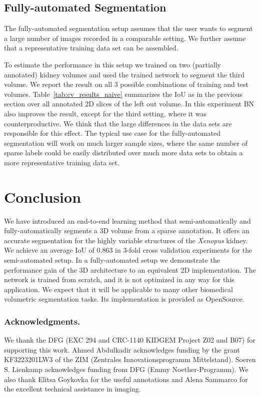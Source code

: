 \documentclass[runningheads,a4paper]{llncs}
\newcommand{\species}[1]{\textit{#1}}
\begin{document}
\subsection{Fully-automated Segmentation}

The fully-automated segmentation setup assumes that the user wants to segment a large number of images recorded in a comparable setting. We further assume that a representative training data set can be assembled. 

To estimate the performance in this setup we trained on two (partially annotated) kidney volumes and used the trained network to segment the third volume. We report the result on all 3 possible combinations of training and test volumes. Table~\ref{tab:cv_results_naive} summarizes the IoU as in the previous section over all annotated 2D slices of the left out volume. In this experiment BN also improves the result, except for the third setting, where it was counterproductive. We think that the large differences in the data sets are responsible for this effect. The typical use case for the fully-automated segmentation will work on much larger sample sizes, where the same number of sparse labels could be easily distributed over much more data sets to obtain a more representative training data set.

\section{Conclusion}\label{references}

We have introduced an end-to-end learning method that semi-automatically and fully-automatically segments a 3D volume from a sparse annotation. It offers an accurate segmentation for the highly variable structures of the \species{Xenopus} kidney. We achieve an average IoU of 0.863 in 3-fold cross validation experiments for the semi-automated setup. In a fully-automated setup we demonstrate the performance gain of the 3D architecture to 
an equivalent 2D implementation. The network is trained from scratch, and it is not optimized in any way for this application. We expect that it will be applicable to many other biomedical volumetric segmentation tasks. Its implementation is provided as OpenSource.

\subsubsection*{Acknowledgments.} We thank the DFG (EXC 294 and CRC-1140 KIDGEM Project Z02 and B07) for supporting this work. Ahmed Abdulkadir acknowledges funding by the grant KF3223201LW3 of the ZIM (Zentrales Innovationsprogramm Mittelstand). Soeren S. Lienkamp acknowledges funding from DFG (Emmy Noether-Programm). We also thank Elitsa Goykovka for the useful annotations and Alena Sammarco for the excellent technical assistance in imaging. 




\end{document}
